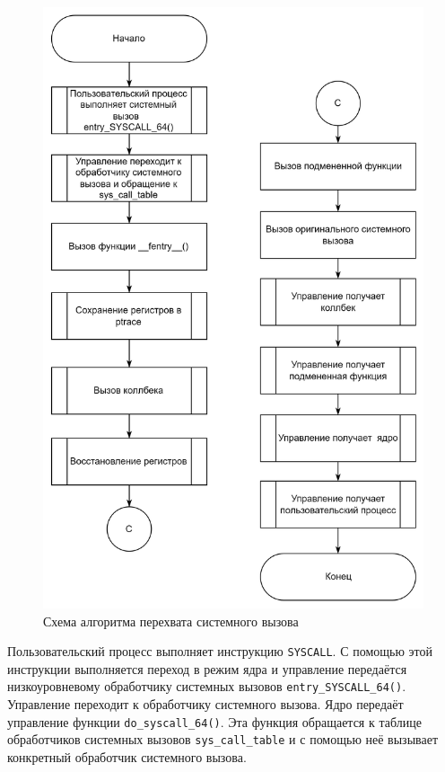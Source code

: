 \begin{figure}[h]
	\centering
	\includegraphics[height=0.6\textheight]{img/alg-ftrace.png}
	\caption{Схема алгоритма перехвата системного вызова}
	\label{img:alg:ftrace}
\end{figure}

Пользовательский процесс выполняет инструкцию \texttt{SYSCALL}. С помощью этой инструкции выполняется переход в режим ядра и управление передаётся низкоуровневому обработчику системных вызовов \newline \texttt{entry\_SYSCALL\_64()}. 
Управление переходит к обработчику системного вызова. Ядро передаёт управление функции \texttt{do\_syscall\_64()}. Эта функция обращается к таблице обработчиков системных вызовов \texttt{sys\_call\_table} и с помощью неё вызывает конкретный обработчик системного вызова.

